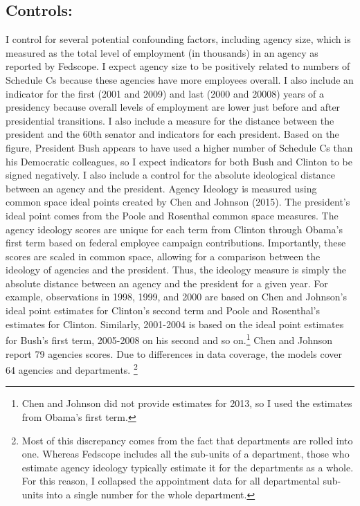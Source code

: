 \documentclass[12pt]{article}
\begin{document}
\subsection*{Controls:}
I control for several potential confounding factors, including agency size, which is measured as the total level of employment (in thousands) in an agency as reported by Fedscope. I expect agency size to be positively related to numbers of Schedule Cs because these agencies have more employees overall. I also include an indicator for the first (2001 and 2009) and last (2000 and 20008) years of a presidency because overall levels of employment are lower just before and after presidential transitions. I also include a measure for the distance between the president and the 60th senator and indicators for each president. Based on the figure, President Bush appears to have used a higher number of Schedule Cs than his Democratic colleagues, so I expect indicators for both Bush and Clinton to be signed negatively. I also include a control for the absolute ideological distance between an agency and the president. Agency Ideology is measured using common space ideal points created by Chen and Johnson (2015). The president's ideal point comes from the Poole and Rosenthal common space measures. The agency ideology scores are unique for each term from Clinton through Obama's first term based on federal employee campaign contributions. Importantly, these scores are scaled in common space, allowing for a comparison between the ideology of agencies and the president. Thus, the ideology measure is simply the absolute distance between an agency and the president for a given year. For example, observations in 1998, 1999, and 2000 are based on Chen and Johnson's ideal point estimates for Clinton's second term and Poole and Rosenthal's estimates for Clinton. Similarly, 2001-2004 is based on the ideal point estimates for Bush's first term, 2005-2008 on his second and so on.\footnote{Chen and Johnson did not provide estimates for 2013, so I used the estimates from Obama's first term.} Chen and Johnson report 79 agencies scores. Due to differences in data coverage, the models cover 64 agencies and departments. \footnote{Most of this discrepancy comes from the fact that departments are rolled into one. Whereas Fedscope includes all the sub-units of a department, those who estimate agency ideology typically estimate it for the departments as a whole. For this reason, I collapsed the appointment data for all departmental sub-units into a single number for the whole department.}
\end{document}
